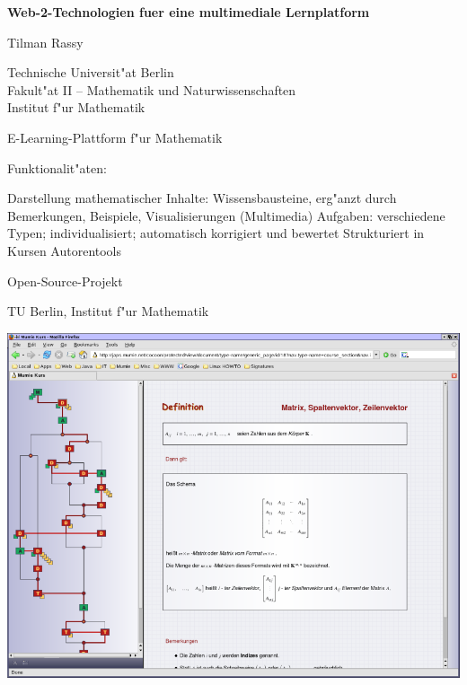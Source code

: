 \documentclass{article}
\begin{document}
\sffamily

\pagebreak

\begin{center}

\textbf{\color{headlinecolor}\titlesize 
Web-2-Technologien fuer eine multimediale Lernplatform}

\vspace{1.0cm}

\normalsize
Tilman Rassy

\vspace{1.0cm}

Technische Universit"at Berlin \\
Fakult"at II -- Mathematik und Naturwissenschaften \\
Institut f"ur Mathematik

\end{center}

\pagebreak


\begin{mylist}

\pitem E-Learning-Plattform f"ur Mathematik

\pitem Funktionalit"aten:
\begin{mylist}[\mylabelitemii]
  \pitem Darstellung mathematischer Inhalte: Wissensbausteine,
         erg"anzt durch Bemerkungen, Beispiele, Visualisierungen (Multimedia)
  \pitem Aufgaben: verschiedene Typen; individualisiert; automatisch
         korrigiert und bewertet
  \pitem Strukturiert in Kursen
  \pitem Autorentools
\end{mylist}

\pitem Open-Source-Projekt
\begin{mylist}[\mylabelitemii]
  \pitem TU Berlin, Institut f"ur Mathematik
\end{mylist}

\end{mylist}

\pagebreak


\begin{center}
\hspace*{-0.5cm} \includegraphics[width=16cm]{mumie_screenshot_01}
\end{center}
\end{document}
